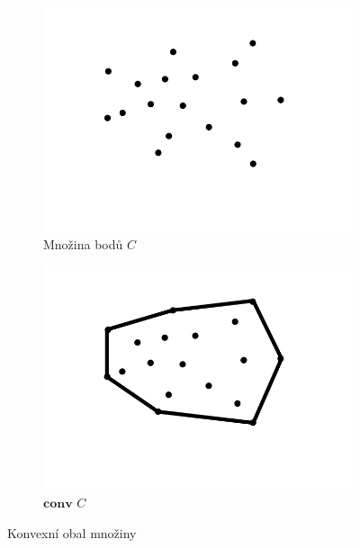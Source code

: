 \begin{figure}[h!]
    \centering
    \begin{subfigure}[b]{0.3\textwidth}
        \centering
        \includegraphics[width=\textwidth]{img/points_for_convex_hull.png}
        \caption{Množina bodů $C$}
        \label{fig:convex_hull:a}
    \end{subfigure}

    \hfill

    \begin{subfigure}[b]{0.3\textwidth}
        \centering
        \includegraphics[width=\textwidth]{img/convex_hull.png}
        \caption{$\textbf{conv }C$}
        \label{fig:convex_hull:b}
    \end{subfigure}
     
    \caption{Konvexní obal množiny}
    \label{fig:convex_hull}
\end{figure}


